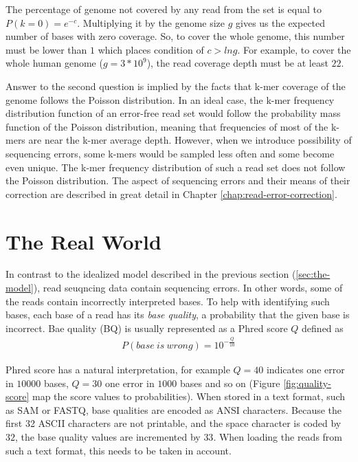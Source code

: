 The percentage of genome not covered by any read from the set is equal to $P(k=0) = e^{-c}$. Multiplying it by the genome size $g$ gives us the expected number of bases with zero coverage. So, to cover the whole genome, this number must be lower than $1$ which places condition of $c > ln g$. For example, to cover the whole human genome ($g = 3 * 10^9$), the read coverage depth must be at least $22$. 

Answer to the second question is implied by the facts that k-mer coverage of the genome follows the Poisson distribution. In an ideal case, the k-mer frequency distribution function of an error-free read set would follow the probability mass function of the Poisson distribution, meaning that frequencies of most of the k-mers are near the k-mer average depth. However, when we introduce possibility of sequencing errors, some k-mers would be sampled less often and some become even unique. The k-mer frequency distribution of such a read set does not follow the Poisson distribution. The aspect of sequencing errors and their means of their correction are described in great detail in Chapter \ref{chap:read-error-correction}.

\section{The Real World}
\label{sec:real-world}

In contrast to the idealized model described in the previous section (\ref{sec:the-model}), read seuqncing data contain sequencing errors. In other words, some of the reads contain incorrectly interpreted bases. To help with identifying such bases, each base of a read has its \textit{base quality}, a probability that the given base is incorrect. Bae quality (BQ) is usually represented as a Phred score $Q$ defined as
\begin{align*}
P(base \: is \: wrong) = 10^{-\frac{Q}{10}}
\end{align*}

Phred score has a natural interpretation, for example $Q=40$ indicates one error in $10000$ bases, $Q=30$ one error in $1000$ bases and so on (Figure \ref{fig:quality-score} map the score values to probabilities). When stored in a text format, such as SAM or FASTQ, base qualities are encoded as ANSI characters. Because the first 32 ASCII characters are not printable, and the space character is coded by $32$, the base quality values are incremented by $33$. When loading the reads from such a text format, this needs to be taken in account.

